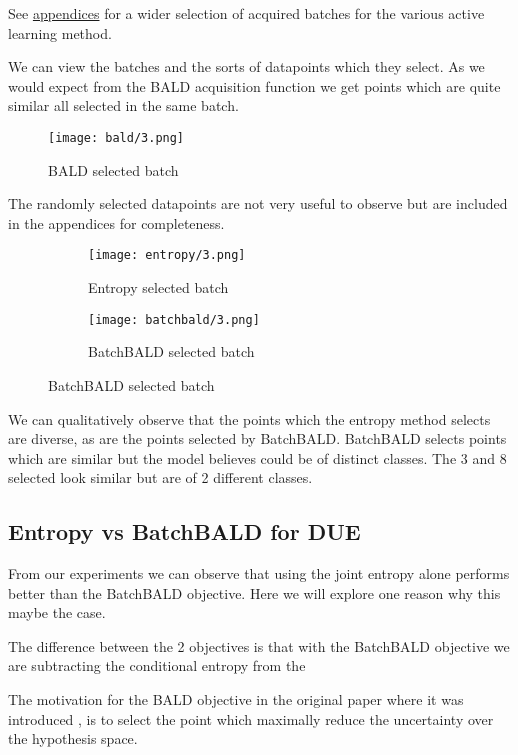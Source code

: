 \documentclass[12pt, a4paper]{report}
\theoremstyle{definition}
\theoremstyle{definition}
\theoremstyle{definition}
\begin{document}
See \hyperref[sec:Batches]{appendices} for a wider selection of acquired batches for the various active learning method.

We can view the batches and the sorts of datapoints which they select. As we would expect from the BALD acquisition function we get points which are quite similar all selected in the same batch.

\begin{figure}[H]
    \centering
    \texttt{[image: bald/3.png]}
    \caption{BALD selected batch}
\end{figure}


The randomly selected datapoints are not very useful to observe but are included in the appendices for completeness.

\begin{figure}[H]
    \centering
    \begin{subfigure}[b]{0.3\textwidth}
        \centering
        \texttt{[image: entropy/3.png]}
        \caption{Entropy selected batch}
    \end{subfigure}
    \hfill
    \begin{subfigure}[b]{0.3\textwidth}
        \centering
        \texttt{[image: batchbald/3.png]}
        \caption{BatchBALD selected batch}
    \end{subfigure}
\end{figure}

We can qualitatively observe that the points which the entropy method selects are diverse, as are the points selected by BatchBALD. BatchBALD selects points which are similar but the model believes could be of distinct classes. The 3 and 8 selected look similar but are of 2 different classes.


\subsection{Entropy vs BatchBALD for DUE}


From our experiments we can observe that using the joint entropy alone performs better than the BatchBALD objective. Here we will explore one reason why this maybe the case.

The difference between the 2 objectives is that with the BatchBALD objective we are subtracting the conditional entropy from the 

The motivation for the BALD objective in the original paper where it was introduced \cite{houlsby2011bayesian}, is to select the point which maximally reduce the uncertainty over the hypothesis space.
\end{document}
